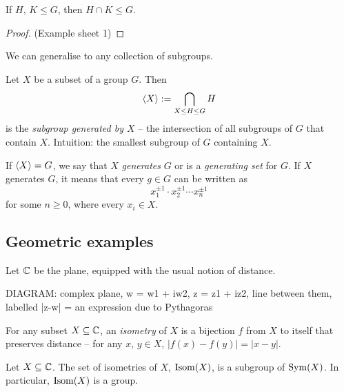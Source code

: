 \documentclass{../../template/note}
\begin{document}

    \begin{proposition}
        If \(H\), \(K \leq G\), then \(H \cap K \leq G\).
    \end{proposition}
    
    \begin{proof}
        (Example sheet 1)
    \end{proof}
    
    \begin{remark*}
        We can generalise to any collection of subgroups.
    \end{remark*}
    
    \begin{definition}
        Let \(X\) be a subset of a group \(G\). Then
        \[
            \left \langle X \right \rangle := \bigcap_{X \leq H \leq G} H
        \]
        is the \emph{subgroup generated by \(X\)} -- the intersection of all subgroups of \(G\) that contain \(X\). Intuition: the smallest subgroup of \(G\) containing \(X\).
    \end{definition}
    
    \begin{definition}
        If \(\left \langle X \right \rangle = G\), we say that \(X\) \emph{generates} \(G\) or is a \emph{generating set} for \(G\). If \(X\) generates \(G\), it means that every \(g \in G\) can be written as
        \[
            x_1^{\pm 1} \cdot x_2^{\pm 1} \cdots x_n^{\pm 1}
        \]
        for some \(n \geq 0\), where every \(x_i \in X\).
    \end{definition}
    
    \subsection{Geometric examples}

    Let \(\mathbb C\) be the plane, equipped with the usual notion of distance. 

    DIAGRAM: complex plane, w = w1 + iw2, z = z1 + iz2, line between them, labelled |z-w| = an expression due to Pythagoras

    \begin{definition}
        For any subset \(X \subseteq \mathbb C\), an \emph{isometry} of \(X\) is a bijection \(f\) from \(X\) to itself that preserves distance -- for any \(x\), \(y \in X\), \(|f(x)-f(y)|=|x-y|\).
    \end{definition}
    
    \begin{proposition}
        Let \(X \subseteq \mathbb C\). The set of isometries of \(X\), \(\operatorname{Isom}(X)\), is a subgroup of \(\operatorname{Sym}(X)\). In particular, \(\operatorname{Isom}(X)\) is a group.
    \end{proposition}
    
\end{document}
